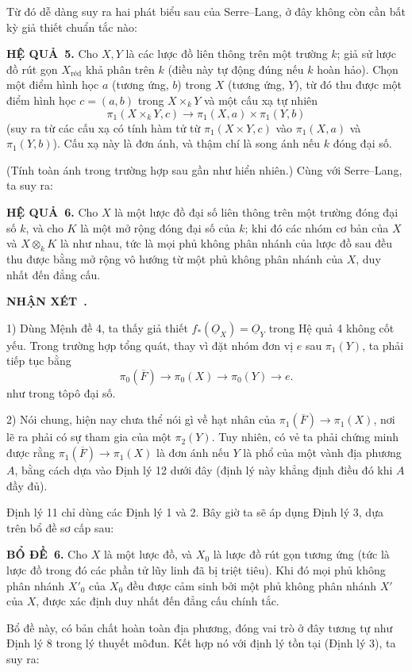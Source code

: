 \documentclass[11pt,twoside,openany]{book}
\numberwithin{equation}{section}
\newcommand{\src}[1]{%
  \phantomsection\hypertarget{src:\fgasourceid:#1}{}%
  \marginpar{\raggedleft\footnotesize\sffamily #1}%
}
\newcommand{\fgasourceid}{unset}
\newcommand{\Osh}{\underline{O}}
\newcommand{\result}[2]{\par\medskip\noindent\textbf{#1\if\relax\detokenize{#2}\relax\else\ #2\fi.}\quad}
\begin{document}
Từ đó dễ dàng suy ra hai phát biểu sau của Serre--Lang, ở đây không còn cần
bất kỳ giả thiết chuẩn tắc nào:

\result{HỆ QUẢ}{5} Cho $X,Y$ là các lược đồ liên thông trên một trường $k$;
giả sử lược đồ rút gọn $X_{\mathrm{réd}}$ khả phân trên $k$ (điều này tự động
đúng nếu $k$ hoàn hảo). Chọn một
điểm hình học $a$ (tương ứng, $b$) trong $X$ (tương ứng, $Y$), từ đó thu được
một điểm hình học $c=(a,b)$ trong $X\times_kY$ và một cấu xạ tự nhiên
\[
  \pi_1(X\times_kY,c)\longrightarrow
  \pi_1(X,a)\times\pi_1(Y,b)
\]
(suy ra từ các cấu xạ có tính hàm tử từ $\pi_1(X\times Y,c)$ vào
$\pi_1(X,a)$ và $\pi_1(Y,b)$). Cấu xạ này là đơn ánh, và thậm chí là song ánh
nếu $k$ đóng đại số.

(Tính toàn ánh trong trường hợp sau gần như hiển nhiên.) Cùng với Serre--Lang,
ta suy ra:

\result{HỆ QUẢ}{6} Cho $X$ là một lược đồ đại số liên thông trên một trường
đóng đại số $k$, và cho $K$ là một mở rộng đóng đại số của $k$;
khi đó các nhóm cơ bản của $X$ và $X\otimes_kK$ là như nhau, tức là mọi phủ
không phân nhánh của lược đồ sau đều thu được bằng mở rộng vô hướng từ một phủ
không phân nhánh của $X$, duy nhất đến đẳng cấu.

\result{NHẬN XÉT}{}

1) Dùng Mệnh đề 4, ta thấy giả thiết $f_*(\Osh_X)=\Osh_Y$ trong Hệ quả 4 không
cốt yếu. Trong trường hợp tổng quát, thay vì đặt nhóm đơn vị $e$ sau
$\pi_1(Y)$, ta phải tiếp tục bằng
\[
  \pi_0(\overline F)\longrightarrow\pi_0(X)
  \longrightarrow\pi_0(Y)\longrightarrow e.
\]
như trong tôpô đại số.

\src{216}
2) Nói chung, hiện nay chưa thể nói gì về hạt nhân của
$\pi_1(\overline F)\longrightarrow\pi_1(X)$, nơi lẽ ra phải có sự tham gia của
một $\pi_2(Y)$. Tuy nhiên, có vẻ ta phải chứng minh được rằng
$\pi_1(\overline F)\longrightarrow\pi_1(X)$ là đơn ánh nếu $Y$ là phổ của một
vành địa phương $A$, bằng cách dựa vào Định lý 12 dưới đây (định lý này khẳng
định điều đó khi $A$ đầy đủ).

Định lý 11 chỉ dùng các Định lý 1 và 2. Bây giờ ta sẽ áp dụng Định lý 3, dựa
trên bổ đề sơ cấp sau:

\result{BỔ ĐỀ}{6} Cho $X$ là một lược đồ, và $X_0$ là lược đồ rút gọn tương
ứng (tức là lược đồ trong đó các phần tử lũy linh đã bị triệt tiêu). Khi đó mọi
phủ không phân nhánh $X'_0$ của $X_0$ đều được cảm sinh bởi một phủ không phân
nhánh $X'$ của $X$, được xác định duy nhất đến đẳng cấu chính tắc.

Bổ đề này, có bản chất hoàn toàn địa phương, đóng vai trò ở đây tương tự như
Định lý 8 trong lý thuyết môđun. Kết hợp nó với định lý tồn tại (Định lý 3),
ta suy ra:
\end{document}
